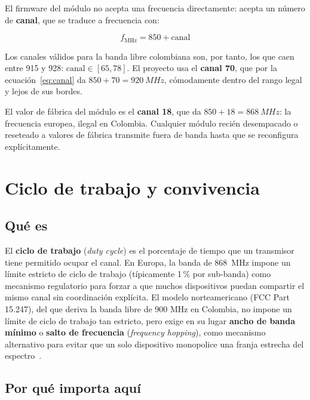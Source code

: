 El firmware del módulo no acepta una frecuencia directamente: acepta un número de
\textbf{canal}, que se traduce a frecuencia con:

\begin{equation}
  f_{\text{MHz}} = 850 + \text{canal}
  \label{eq:canal}
\end{equation}

Los canales válidos para la banda libre colombiana son, por tanto, los que caen entre 915 y
928: $\text{canal} \in [65, 78]$. El proyecto usa el \textbf{canal 70}, que por la
ecuación~\eqref{eq:canal} da $850 + 70 = \SI{920}{MHz}$, cómodamente dentro del rango legal y
lejos de sus bordes.

\begin{trampa}
El valor de fábrica del módulo es el \textbf{canal 18}, que da $850 + 18 = \SI{868}{MHz}$: la
frecuencia europea, ilegal en Colombia. Cualquier módulo recién desempacado o reseteado a
valores de fábrica transmite fuera de banda hasta que se reconfigura explícitamente.
\end{trampa}

\chapter{Ciclo de trabajo y convivencia}

\section{Qué es}

El \textbf{ciclo de trabajo} (\emph{duty cycle}) es el porcentaje de tiempo que un transmisor
tiene permitido ocupar el canal. En Europa, la banda de \SI{868}{MHz} impone un límite estricto
de ciclo de trabajo (típicamente 1\,\% por sub-banda) como mecanismo regulatorio para forzar a
que muchos dispositivos puedan compartir el mismo canal sin coordinación explícita. El modelo
norteamericano (FCC Part 15.247), del que deriva la banda libre de 900 MHz en Colombia, no
impone un límite de ciclo de trabajo tan estricto, pero exige en su lugar \textbf{ancho de
banda mínimo} o \textbf{salto de frecuencia} (\emph{frequency hopping}), como mecanismo
alternativo para evitar que un solo dispositivo monopolice una franja estrecha del
espectro~\cite{fcc_15247}.

\section{Por qué importa aquí}

